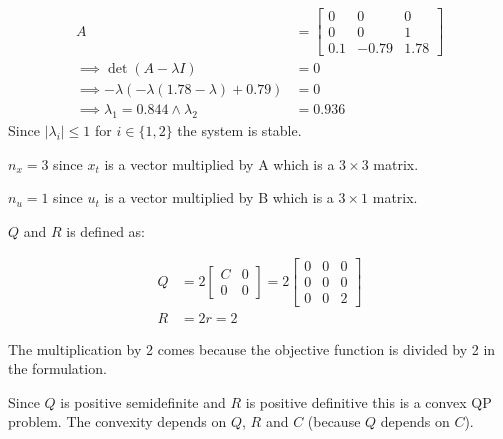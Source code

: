 \documentclass[11pt, a4paper, english]{NTNUoving}
\begin{document}
\begin{oppgave}

    \begin{punkt}
        \begin{align*}
            A &= \begin{bmatrix}
                0 & 0 & 0 \\
                0 & 0 & 1 \\
                0.1 & -0.79 & 1.78
            \end{bmatrix} \\
            \implies \det(A-\lambda I) &= 0 \\
            \implies -\lambda(-\lambda(1.78-\lambda) + 0.79) &= 0 \\
            \implies \lambda_1 = 0.844 \wedge \lambda_2 &= 0.936
        \end{align*}
        Since $|\lambda_i| \leq 1$ for $i \in \{1,2\}$ the system is stable.
    \end{punkt}

    \begin{punkt}
        $n_x = 3$ since $x_t$ is a vector multiplied by A which is a $3 \times 3$ matrix.

        $n_u = 1$ since $u_t$ is a vector multiplied by B which is a $3 \times 1$ matrix.

        $Q$ and $R$ is defined as:

        \begin{align*}
            Q &= 2\begin{bmatrix}
                C & 0 \\
                0 & 0
            \end{bmatrix}
            = 2 \begin{bmatrix}
                0 & 0 & 0 \\
                0 & 0 & 0 \\
                0 & 0 & 2
            \end{bmatrix} \\
            R &= 2r = 2
        \end{align*}

        The multiplication by 2 comes because the objective function is divided by 2 in the formulation.

    \end{punkt}

    \begin{punkt}

        Since $Q$ is positive semidefinite and $R$ is positive definitive this is a convex QP problem. The convexity
        depends on $Q$, $R$ and $C$ (because $Q$ depends on $C$).


\end{punkt}
\end{oppgave}
\end{document}
